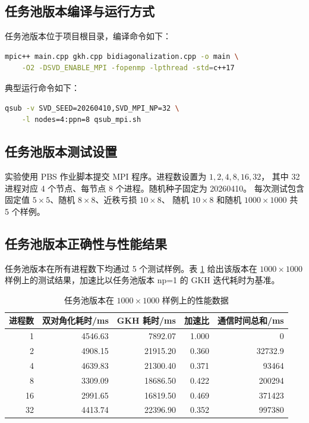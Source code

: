 \documentclass[UTF8,a4paper,10pt]{ctexart}
\begin{document}
\subsection{任务池版本编译与运行方式}
任务池版本位于项目根目录，编译命令如下：
\begin{lstlisting}[language=bash]
mpic++ main.cpp gkh.cpp bidiagonalization.cpp -o main \
    -O2 -DSVD_ENABLE_MPI -fopenmp -lpthread -std=c++17
\end{lstlisting}
典型运行命令如下：
\begin{lstlisting}[language=bash]
qsub -v SVD_SEED=20260410,SVD_MPI_NP=32 \
    -l nodes=4:ppn=8 qsub_mpi.sh
\end{lstlisting}

\subsection{任务池版本测试设置}
实验使用 PBS 作业脚本提交 MPI 程序。进程数设置为 $1,2,4,8,16,32$，
其中 32 进程对应 4 个节点、每节点 8 个进程。随机种子固定为 20260410。
每次测试包含固定值 $5\times 5$、随机 $8\times 8$、近秩亏损 $10\times 8$、
随机 $10\times 8$ 和随机 $1000\times 1000$ 共 5 个样例。

\subsection{任务池版本正确性与性能结果}
任务池版本在所有进程数下均通过 5 个测试样例。表 \ref{tab:taskpool} 给出该版本在
$1000\times 1000$ 样例上的测试结果，加速比以任务池版本 np=1 的 GKH 迭代耗时为基准。

\begin{table}[H]
  \centering
  \begin{tabular}{rrrrr}
    \toprule
    进程数 & 双对角化耗时/ms & GKH 耗时/ms & 加速比 & 通信时间总和/ms \\
    \midrule
    1  & 4546.63 & 7892.07  & 1.000 & 0 \\
    2  & 4908.15 & 21915.20 & 0.360 & 32732.9 \\
    4  & 4639.83 & 21300.40 & 0.371 & 93464 \\
    8  & 3309.09 & 18686.50 & 0.422 & 200294 \\
    16 & 2991.65 & 16819.50 & 0.469 & 371423 \\
    32 & 4413.74 & 22396.90 & 0.352 & 997380 \\
    \bottomrule
  \end{tabular}
  \caption{任务池版本在 $1000\times 1000$ 样例上的性能数据}
  \label{tab:taskpool}
\end{table}
\end{document}
